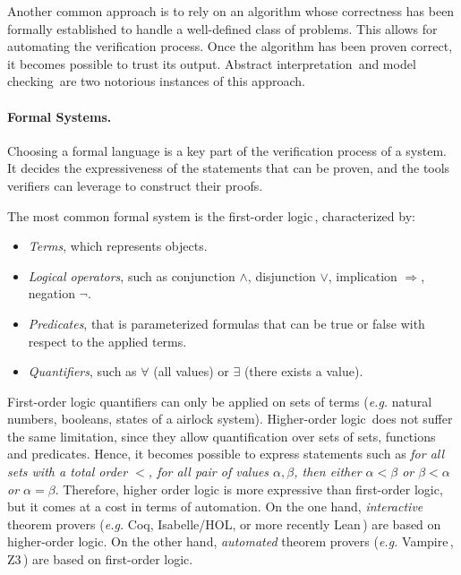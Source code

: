 Another common approach is to rely on an algorithm whose correctness has been
formally established to handle a well-defined class of problems.
%
This allows for automating the verification process.
%
Once the algorithm has been proven correct, it becomes possible to trust its
output.
%
Abstract interpretation\,\cite{cousot1977absint} and model
checking\,\cite{clarke2018modelc} are two notorious instances of this approach.

\paragraph{Formal Systems.}
%
Choosing a formal language is a key part of the verification process of a
system.
%
It decides the expressiveness of the statements that can be proven, and the
tools verifiers can leverage to construct their proofs.

The most common formal system is the first-order logic\,\cite{smullyan2012fol},
characterized by:
%
\begin{itemize}
\item \emph{Terms}, which represents objects.
\item \emph{Logical operators}, such as conjunction \( \wedge \), disjunction
  \( \vee \), implication \( \Rightarrow \), negation \( \neg \).
\item \emph{Predicates}, that is parameterized formulas that can be true or
  false with respect to the applied terms.
\item \emph{Quantifiers}, such as \( \forall \) (all values) or \( \exists \)
  (there exists a value).
\end{itemize}

First-order logic quantifiers can only be applied on sets of terms (\emph{e.g.}
natural numbers, booleans, states of a airlock system).
%
Higher-order logic\,\cite{leivant1994hol} does not suffer the same limitation,
since they allow quantification over sets of sets, functions and predicates.
%
Hence, it becomes possible to express statements such as \emph{for all sets with
  a total order \( < \), for all pair of values \( \alpha, \beta \), then either
  \( \alpha < \beta \) or \( \beta < \alpha \) or \( \alpha = \beta \)}.
%
Therefore, higher order logic is more expressive than first-order logic, but it
comes at a cost in terms of automation.
%
On the one hand, \emph{interactive} theorem provers (\emph{e.g.}  Coq,
Isabelle/HOL, or more recently Lean\,\cite{de2015lean}) are based on
higher-order logic.
%
On the other hand, \emph{automated} theorem provers (\emph{e.g.}
Vampire\,\cite{riazanov2002vampire}, Z3\,\cite{de2008z3}) are based on
first-order logic.

